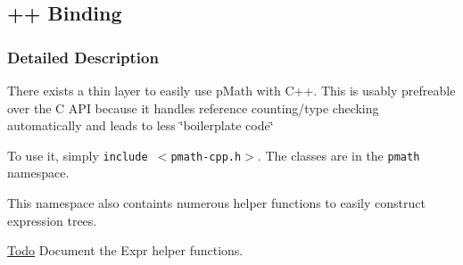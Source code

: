 \hypertarget{group___c}{
\subsection{++ Binding}
\label{group___c}
}


\subsubsection{Detailed Description}
There exists a thin layer to easily use pMath with C++. This is usably prefreable over the C API because it handles reference counting/type checking automatically and leads to less \char`\"{}boilerplate code\char`\"{}

To use it, simply {\tt include $<$pmath-cpp.h$>$}. The classes are in the {\tt pmath} namespace.

This namespace also containts numerous helper functions to easily construct expression trees.

\begin{Desc}
\item[\hyperlink{todo__todo000001}{Todo}]Document the Expr helper functions.\end{Desc}
